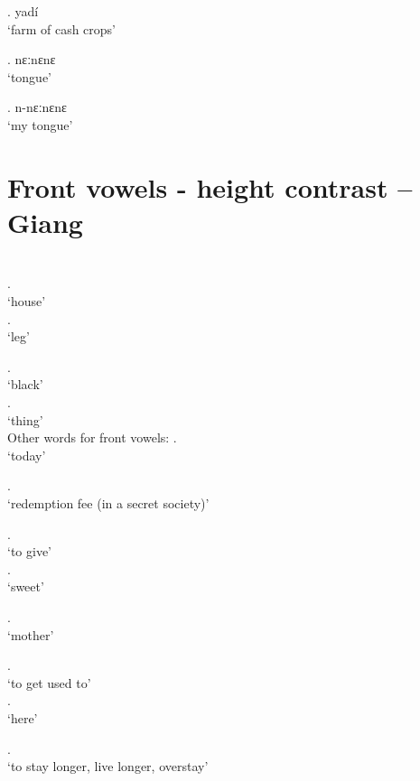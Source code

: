 \documentclass{assets/fieldnotes}
\begin{document}
\ex. yadí\\
`farm of cash crops'

\ex. nɛːnɛnɛ\\
`tongue'

\ex. n-nɛːnɛnɛ\\
`my tongue'

\section{Front vowels - height contrast -- Giang}

\\

\ex. \\
`house'
\\

\ex. \\
`leg'

\ex. \\
`black'
\\

\ex. \\
`thing'
\\

Other words for front vowels:
\ex. \\
`today'


\ex. \\
`redemption fee (in a secret society)'

\ex. \\
`to give'
\\

\ex. \\
`sweet'

\ex. \\
`mother'

\ex. \\
`to get used to'
\\

\ex. \\
`here'

\ex. \\
`to stay longer, live longer, overstay'
\end{document}
